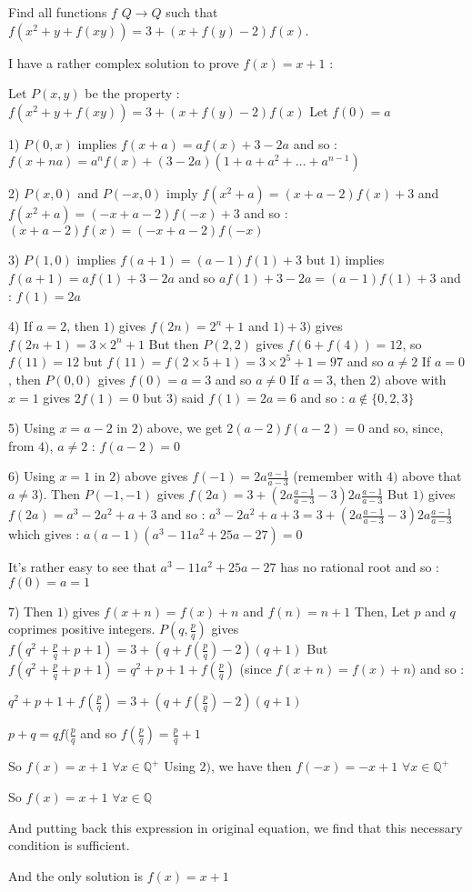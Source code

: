 \begin{solution}
	\begin{tcolorbox}Find all functions $ f$ $ Q\to Q$  such that $ f(x^{2} + y + f(xy)) = 3 + (x + f(y) - 2)f(x)$.\end{tcolorbox}

I have a rather complex solution to prove $ f(x)=x+1$ :

Let $ P(x,y)$ be the property : $ f(x^{2} + y + f(xy)) = 3 + (x + f(y) - 2)f(x)$
Let $ f(0)=a$

1) $ P(0,x)$ implies $ f(x+a)=af(x)+3-2a$ and so :
$ \boxed{f(x+na)=a^nf(x)+(3-2a)(1+a+a^2+\ldots+a^{n-1})}$

2) $ P(x,0)$ and $ P(-x,0)$ imply $ f(x^2+a)=(x+a-2)f(x)+3$ and $ f(x^2+a)=(-x+a-2)f(-x)+3$ and so :
$ \boxed{(x+a-2)f(x)=(-x+a-2)f(-x)}$

3) $ P(1,0)$ implies $ f(a+1)=(a-1)f(1)+3$ but $ 1)$ implies $ f(a+1)=af(1)+3-2a$ and so $ af(1)+3-2a=(a-1)f(1)+3$ and :
$ \boxed{f(1)=2a}$

4) If $ a=2$, then $ 1)$ gives $ f(2n)=2^n+1$ and $ 1)+3)$ gives $ f(2n+1)=3\times 2^n+1$
But then $ P(2,2)$ gives $ f(6+f(4))=12$, so $ f(11)=12$ but $ f(11)=f(2\times 5+1)=3\times 2^5+1=97$ and so $ a\neq 2$
If $ a=0$, then $ P(0,0)$ gives $ f(0)=a=3$ and so $ a\neq 0$
If $ a=3$, then $ 2)$ above with $ x=1$ gives $ 2f(1)=0$ but $ 3)$ said $ f(1)=2a=6$ and so :
$ \boxed{a\notin \{0,2,3\}}$

5) Using $ x=a-2$ in $ 2)$ above, we get $ 2(a-2)f(a-2)=0$ and so, since, from $ 4)$, $ a\neq 2$ :
$ \boxed{f(a-2)=0}$

6) Using $ x=1$ in $ 2)$ above gives $ f(-1)=2a\frac{a-1}{a-3}$ (remember with $ 4)$ above that $ a\neq 3$).
Then $ P(-1,-1)$ gives $ f(2a)=3 + (2a\frac{a-1}{a-3} - 3)2a\frac{a-1}{a-3}$
But $ 1)$ gives $ f(2a)=a^3-2a^2+a+3$ and so :
$ a^3-2a^2+a+3=3 + (2a\frac{a-1}{a-3} - 3)2a\frac{a-1}{a-3}$ which gives :
$ a(a-1)(a^3-11a^2+25a-27)= 0$

It's rather easy to see that $ a^3-11a^2+25a-27$ has no rational root and so :
$ \boxed{f(0)=a=1}$

7) Then $ 1)$ gives $ f(x+n)=f(x)+n$ and $ f(n)=n+1$
Then, Let $ p$ and $ q$ coprimes positive integers.
$ P(q,\frac{p}{q})$ gives $ f(q^2+\frac{p}{q}+p+1)=3 + (q + f(\frac{p}{q}) - 2)(q+1)$
But $ f(q^2+\frac{p}{q}+p+1)=q^2+p+1+f(\frac{p}{q})$ (since $ f(x+n)=f(x)+n$) and so :

$ q^2+p+1+f(\frac{p}{q})=3 + (q + f(\frac{p}{q}) - 2)(q+1)$

$ p+q=qf(\frac{p}{q}$ and so $ f(\frac{p}{q})=\frac{p}{q}+1$

So $ f(x)=x+1$ $ \forall x\in\mathbb{Q}^{+}$
Using $ 2)$, we have then $ f(-x)=-x+1$ $ \forall x\in\mathbb{Q}^{+}$

So $ f(x)=x+1$ $ \forall x\in\mathbb{Q}$

And putting back this expression in original equation, we find that this necessary condition is sufficient.

And the only solution is $ \boxed{f(x)=x+1}$
\end{solution}




